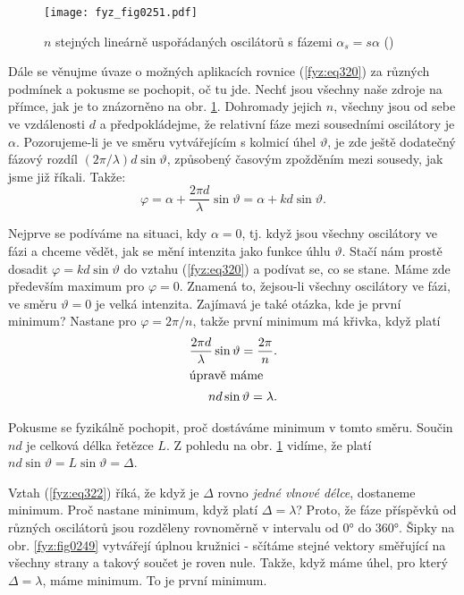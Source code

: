     \begin{figure}[ht!] %
      \centering
      \texttt{[image: fyz\_fig0251.pdf]}
      \caption{\(n\) stejných lineárně uspořádaných oscilátorů s fázemi \(\alpha_s = s\alpha\)
               (\cite[s.~394]{Feynman01})}
      \label{fyz:fig0251}
    \end{figure}

    Dále se věnujme úvaze o možných aplikacích rovnice (\ref{fyz:eq320}) za různých podmínek a 
    pokusme se pochopit, oč tu jde. Nechť jsou všechny naše zdroje na přímce, jak je to znázorněno 
    na obr. \ref{fyz:fig0251}. Dohromady jejich \(n\), všechny jsou od sebe ve vzdálenosti \(d\) a 
    předpokládejme, že relativní fáze mezi sousedními oscilátory je \(\alpha\). Pozorujeme-li je ve 
    směru vytvářejícím s kolmicí úhel \(\vartheta\), je zde ještě dodatečný fázový rozdíl 
    \((2\pi/\lambda)d\sin\vartheta\), způsobený časovým zpožděním mezi sousedy, jak jsme již 
    říkali. Takže:
    \begin{equation}\label{fyz:eq321}
      \varphi = \alpha + \frac{2\pi d}{\lambda}\sin\vartheta = \alpha + kd\sin\vartheta.
    \end{equation}
    
    Nejprve se podíváme na situaci, kdy \(\alpha = 0\), tj. když jsou všechny oscilátory ve fázi a 
    chceme vědět, jak se mění intenzita jako funkce úhlu \(\vartheta\). Stačí nám prostě dosadit 
    \(\varphi = kd\sin\vartheta\) do vztahu (\ref{fyz:eq320}) a podívat se, co se stane. Máme zde 
    především maximum pro \(\varphi=0\). Znamená to, žejsou-li všechny oscilátory ve fázi, ve směru 
    \(\vartheta = 0\) je velká intenzita. Zajímavá je také otázka, kde je první minimum? Nastane 
    pro \(\varphi = 2\pi/n\), takže první minimum má křivka, když platí 
    \begin{align}
      \frac{2\pi d}{\lambda}\sin\vartheta = \frac{2\pi}{n}. \nonumber \\
      \shortintertext{úpravě máme}  
      nd\sin\vartheta = \lambda.                            \label{fyz:eq322}
    \end{align}

    Pokusme se fyzikálně pochopit, proč dostáváme minimum v tomto směru. Součin \(nd\) je celková 
    délka řetězce \(L\). Z pohledu na obr. \ref{fyz:fig0251} vidíme, že platí \(nd\sin\vartheta = L 
    \sin\vartheta = \Delta\).
    
    Vztah (\ref{fyz:eq322}) říká, že když je \(\Delta\) rovno \emph{jedné vlnové délce}, dostaneme 
    minimum. Proč nastane minimum, když platí \(\Delta = \lambda\)? Proto, že fáze příspěvků od 
    různých oscilátorů jsou rozděleny rovnoměrně v intervalu od \ang{0} do \ang{360}. Šipky na obr. 
    \ref{fyz:fig0249} vytvářejí úplnou kružnici - sčítáme stejné vektory směřující na všechny strany 
    a takový součet je roven nule. Takže, když máme úhel, pro který \(\Delta = \lambda\), máme 
    minimum. To je první minimum.
    
